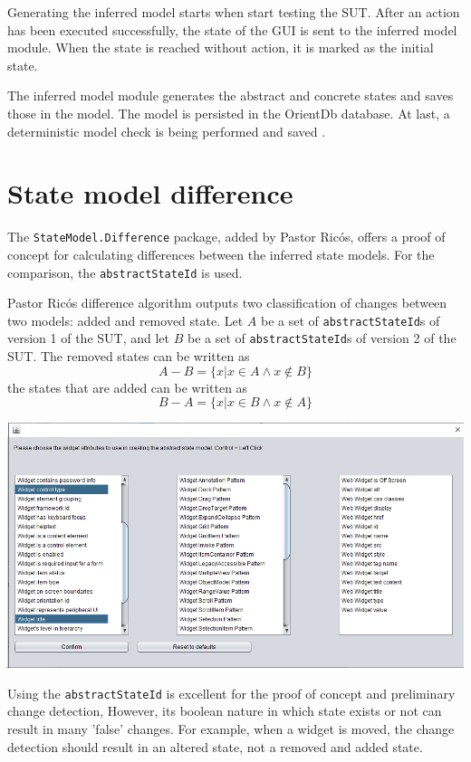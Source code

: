 Generating the inferred model starts when \testar start testing the SUT. After an action has been executed successfully, the state of the GUI is sent to the inferred model module. When the state is reached without action, it is marked as the initial state. 

The inferred model module generates the abstract and concrete states and saves those in the model. The model is persisted in the OrientDb database. At last, a deterministic model check is being performed and saved \cite{testar-code}.

\section{State model difference} \label{sec:state-model-difference}
The \verb|StateModel.Difference| package, added by Pastor Ricós\cite{stateDiff}, offers a proof of concept for calculating differences between the inferred state models. For the comparison, the \verb|abstractStateId| is used. 

Pastor Ricós difference algorithm\cite{stateDiff} outputs two classification of changes between two models: added and removed state. Let $A$ be a set of \verb|abstractStateId|s of version 1 of the SUT, and let $B$ be a set of \verb|abstractStateId|s of version 2 of the SUT. The removed states can be written as
\[A-B = \lbrace x | x \in A \wedge x \notin B \rbrace\]
the states that are added can be written as
\[B-A = \lbrace x | x \in B \wedge x \notin A \rbrace\]

\begingroup
\captionsetup{type=figure}
\includegraphics[scale=0.5]{images/attributes-state-model.png}
\label{fig:advance}
\endgroup

Using the \verb|abstractStateId| is excellent for the proof of concept and preliminary change detection, 
However, its boolean nature in which state exists or not can result in many 'false' changes. For example, when a widget is moved, the change detection should result in an altered state, not a removed and added state. 

